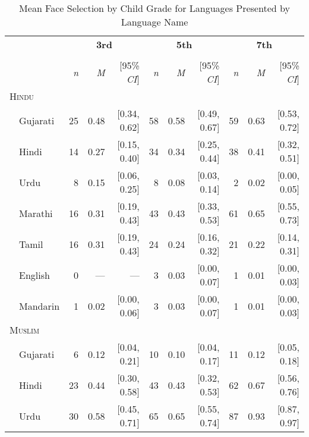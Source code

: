 \begin{table}[H]
\centering
\caption{Mean Face Selection by Child Grade for Languages Presented by Language Name}
\begin{footnotesize}
\label{tab:face-label-means}
\begin{tabular}{p{.1in}lrrrrrrrrr}
\toprule
 &  & \multicolumn{3}{c}{\textbf{3rd}} & \multicolumn{3}{c}{\textbf{5th}} & \multicolumn{3}{c}{\textbf{7th}} \\
\cline{3-5} \cline{6-8} \cline{9-11}\\[-.75em]
&  & \textit{n} & \textit{M} & [95\% \textit{CI}] &  \textit{n} & \textit{M} & [95\% \textit{CI}] &  \textit{n}  & \textit{M} & [95\% \textit{CI}]\\
\midrule
\multicolumn{11}{l}{\textsc{Hindu}}\\
& Gujarati & 25 & 0.48 & [0.34, 0.62] & 58 & 0.58 & [0.49, 0.67] & 59 & 0.63 & [0.53, 0.72]\\

 & Hindi & 14 & 0.27 & [0.15, 0.40] & 34 & 0.34 & [0.25, 0.44] & 38 & 0.41 & [0.32, 0.51]\\

 & Urdu & 8 & 0.15 & [0.06, 0.25] & 8 & 0.08 & [0.03, 0.14] & 2 & 0.02 & [0.00, 0.05]\\

 & Marathi & 16 & 0.31 & [0.19, 0.43] & 43 & 0.43 & [0.33, 0.53] & 61 & 0.65 & [0.55, 0.73]\\

 & Tamil & 16 & 0.31 & [0.19, 0.43] & 24 & 0.24 & [0.16, 0.32] & 21 & 0.22 & [0.14, 0.31]\\

 & English & 0 & --- & --- & 3 & 0.03 & [0.00, 0.07] & 1 & 0.01 & [0.00, 0.03]\\

& Mandarin & 1 & 0.02 & [0.00, 0.06] & 3 & 0.03 & [0.00, 0.07] & 1 & 0.01 & [0.00, 0.03]\\

\midrule
\multicolumn{11}{l}{\textsc{Muslim}}\\
& Gujarati & 6 & 0.12 & [0.04, 0.21] & 10 & 0.10 & [0.04, 0.17] & 11 & 0.12 & [0.05, 0.18]\\

 & Hindi & 23 & 0.44 & [0.30, 0.58] & 43 & 0.43 & [0.32, 0.53] & 62 & 0.67 & [0.56, 0.76]\\

 & Urdu & 30 & 0.58 & [0.45, 0.71] & 65 & 0.65 & [0.55, 0.74] & 87 & 0.93 & [0.87, 0.97]\\


\end{tabular}
\end{footnotesize}
\end{table}
